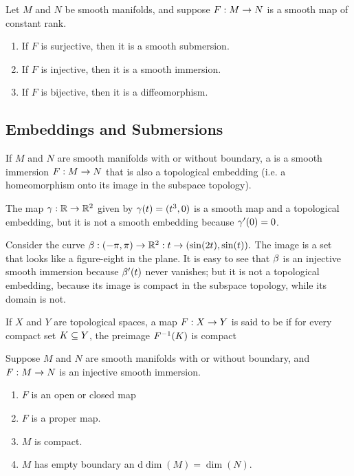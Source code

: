 \begin{thm}
Let $M$ and $N$ be smooth manifolds, and suppose $F:M\rightarrow N$ is a smooth map of constant rank.
\begin{enumerate}
    \item If $F$ is surjective, then it is a smooth submersion.
    \item If $F$ is injective, then it is a smooth immersion.
    \item If $F$ is bijective, then it is a diffeomorphism.
\end{enumerate}
\end{thm}

\subsection{Embeddings and Submersions}\nl 

\dfn If $M$ and $N$ are smooth manifolds with or without boundary, a  is a smooth immersion $F:M\rightarrow N$ that is also a topological embedding (i.e. a homeomorphism onto its image in the subspace topology).

\setcounter{thm}{17}

\begin{ex}
The map $\gamma:\mathbb{R}\rightarrow\mathbb{R}^2$ given by $\gamma(t) = (t^3,0)$ is a smooth map and a topological embedding, but it is not a smooth embedding because $\gamma^\prime(0) = 0$.
\end{ex}

\begin{ex}
Consider the curve $\beta:(-\pi,\pi)\rightarrow \mathbb{R}^2:t\rightarrow (\sin(2t), \sin(t)).$ The image is a set that looks like a figure-eight in the plane. It is easy to see that $\beta$ is an injective smooth immersion because $\beta^\prime(t)$ never vanishes; but it is not a topological embedding, because its image is compact in the subspace topology, while its domain is not.
\end{ex}

\setcounter{thm}{21}

\dfn If $X$ and $Y$ are topological spaces, a map $F:X\rightarrow Y$ is said to be  if for every compact set $K\subseteq Y$, the preimage $F^{-1}(K)$ is compact

\begin{prop}
Suppose $M$ and $N$ are smooth manifolds with or without boundary, and $F:M\rightarrow N$ is an injective smooth immersion. 
\begin{enumerate}
    \item $F$ is an open or closed map
    \item $F$ is a proper map.
    \item $M$ is compact.
    \item $M$ has empty boundary an d$\dim(M) = \dim(N)$.
\end{enumerate}
\end{prop}

